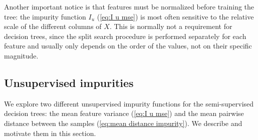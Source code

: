 Another important notice is that features must be normalized before training the tree: the impurity function $I_u$ (\autoref{eq:I u mse}) is most often sensitive to the relative scale of the different columns of $X$. This is normally not a requirement for decision trees, since the split search procedure is performed separately for each feature and usually only depends on the order of the values, not on their specific magnitude.


\subsection{Unsupervised impurities}
\label{sec:Iu}

We explore two different unsupervised impurity functions for the semi-supervised decision trees: the mean feature variance (\autoref{eq:I u mse}) and the mean pairwise distance between the samples (\autoref{eq:mean distance impurity}). We describe and motivate them in this section.

